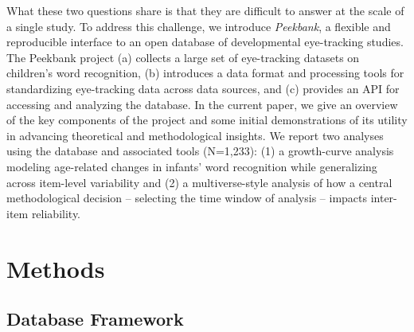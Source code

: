 \documentclass[10pt, letterpaper]{article}
\begin{document}
What these two questions share is that they are difficult to answer at
the scale of a single study. To address this challenge, we introduce
\emph{Peekbank}, a flexible and reproducible interface to an open
database of developmental eye-tracking studies. The Peekbank project (a)
collects a large set of eye-tracking datasets on children's word
recognition, (b) introduces a data format and processing tools for
standardizing eye-tracking data across data sources, and (c) provides an
API for accessing and analyzing the database. In the current paper, we
give an overview of the key components of the project and some initial
demonstrations of its utility in advancing theoretical and
methodological insights. We report two analyses using the database and
associated tools (N=1,233): (1) a growth-curve analysis modeling
age-related changes in infants' word recognition while generalizing
across item-level variability and (2) a multiverse-style analysis of how
a central methodological decision -- selecting the time window of
analysis -- impacts inter-item reliability.

\hypertarget{methods}{%
\section{Methods}\label{methods}}

\hypertarget{database-framework}{%
\subsection{Database Framework}\label{database-framework}}
\end{document}
